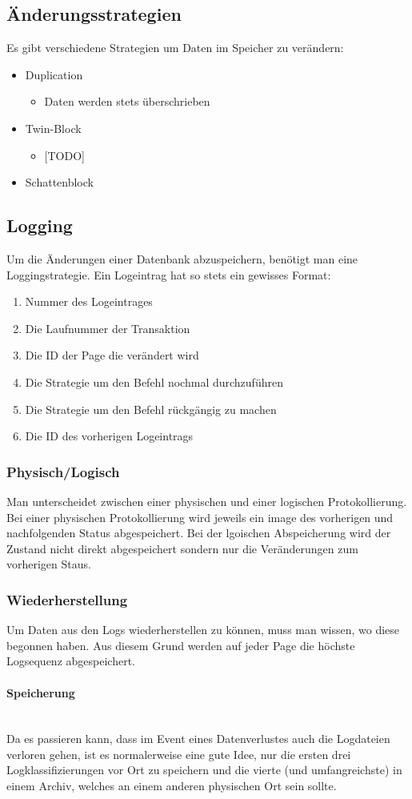 \documentclass{article}
\newcommand{\paragraphlb}[1]{\paragraph{#1}\mbox{}\\}
\begin{document}
	\subsection{Änderungsstrategien}
	Es gibt verschiedene Strategien um Daten im Speicher zu verändern:
	\begin{itemize}
		\item{Duplication}
		\begin{itemize}
			\item{Daten werden stets überschrieben}
		\end{itemize}
		\item{Twin-Block}
		\begin{itemize}
			\item{[TODO]}
		\end{itemize}
		\item{Schattenblock}
	\end{itemize}
	\subsection{Logging}
	Um die Änderungen einer Datenbank abzuspeichern, benötigt man eine Loggingstrategie. Ein Logeintrag hat so stets ein gewisses Format:
	\begin{enumerate}
		\item{Nummer des Logeintrages}
		\item{Die Laufnummer der Transaktion}
		\item{Die ID der Page die verändert wird}
		\item{Die Strategie um den Befehl nochmal durchzuführen}
		\item{Die Strategie um den Befehl rückgängig zu machen}
		\item{Die ID des vorherigen Logeintrags}
	\end{enumerate}
	\subsubsection{Physisch/Logisch}
	Man unterscheidet zwischen einer physischen und einer logischen Protokollierung. Bei einer physischen Protokollierung wird jeweils ein image des vorherigen und nachfolgenden Status abgespeichert. Bei der lgoischen Abspeicherung wird der Zustand nicht direkt abgespeichert sondern nur die Veränderungen zum vorherigen Staus.
	\subsubsection{Wiederherstellung}
	Um Daten aus den Logs wiederherstellen zu können, muss man wissen, wo diese begonnen haben. Aus diesem Grund werden auf jeder Page die höchste Logsequenz abgespeichert.
	\paragraphlb{Speicherung}
	Da es passieren kann, dass im Event eines Datenverlustes auch die Logdateien verloren gehen, ist es normalerweise eine gute Idee, nur die ersten drei Logklassifizierungen vor Ort zu speichern und die vierte (und umfangreichste) in einem Archiv, welches an einem anderen physischen Ort sein sollte.
\end{document}
